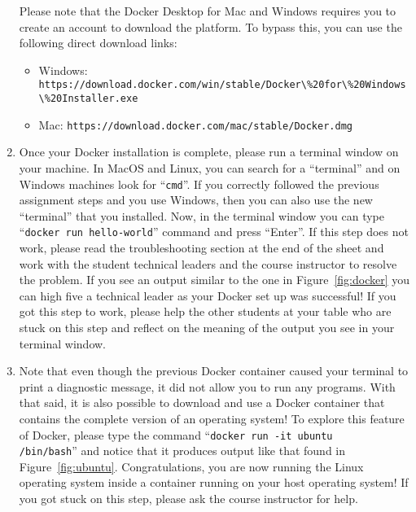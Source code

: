 \documentclass[11pt]{article}
\newcommand{\command}[1]{``\lstinline{#1}''}
\newcommand{\url}[1]{\lstinline{#1}}
\begin{document}
\begin{enumerate}
      Please note that the Docker Desktop for Mac and Windows requires you to
      create an account to download the platform. To bypass this, you can use
      the following direct download links:

    \begin{itemize}
        \item Windows: \\ \url{https://download.docker.com/win/stable/Docker\%20for\%20Windows\%20Installer.exe}
        \item Mac: \url{https://download.docker.com/mac/stable/Docker.dmg}
    \end{itemize}

  \item Once your Docker installation is complete, please run a terminal window
    on your machine. In MacOS and Linux, you can search for a ``terminal'' and
    on Windows machines look for \command{cmd}. If you correctly followed the
    previous assignment steps and you use Windows, then you can also use the new
    ``terminal'' that you installed. Now, in the terminal window you can type
    \command{docker run hello-world} command and press ``Enter''. If this step
    does not work, please read the troubleshooting section at the end of the
    sheet and work with the student technical leaders and the course instructor
    to resolve the problem. If you see an output similar to the one in
    Figure~\ref{fig:docker} you can high five a technical leader as your Docker
    set up was successful! If you got this step to work, please  help the other
    students at your table who are stuck on this step and reflect on the meaning
    of the output you see in your terminal window.

  \item Note that even though the previous Docker container caused your terminal
    to print a diagnostic message, it did not allow you to run any programs.
    With that said, it is also possible to download and use a Docker container
    that contains the complete version of an operating system! To explore this
    feature of Docker, please type the command \command{docker run -it ubuntu
    /bin/bash} and notice that it produces output like that found in
    Figure~\ref{fig:ubuntu}. Congratulations, you are now running the Linux
    operating system inside a container running on your host operating system!
    If you got stuck on this step, please ask the course instructor for help.


\end{enumerate}
\end{document}
